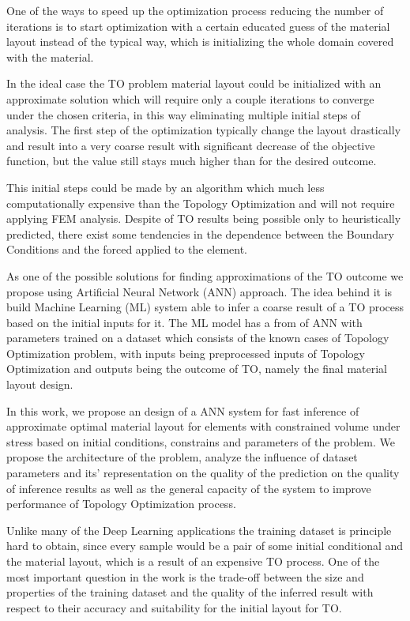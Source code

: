 One of the ways to speed up the optimization process reducing the number of iterations is to start optimization with a certain educated guess of the material layout instead of the typical way, which is initializing the whole domain covered with the material.
\bigskip

In the ideal case the TO problem material layout could be initialized with an approximate solution which will require only a couple iterations to converge under the chosen criteria, in this way eliminating multiple initial steps  of analysis.
The first step of the optimization typically change the layout drastically and result into a very coarse result with significant decrease of the objective function, but the value still stays much higher than for the desired outcome. 
\bigskip

This initial steps could be made by an algorithm which much less computationally expensive than the Topology Optimization and will not require applying FEM analysis. 
Despite of TO results being possible only to heuristically predicted, there exist some tendencies in the dependence between the Boundary Conditions and the forced applied to the element. 
\bigskip

As one of the possible solutions for finding approximations of the TO outcome we propose using Artificial Neural Network (ANN) approach.
The idea behind it is build Machine Learning (ML) system able to infer a coarse result of a TO process based on the initial inputs for it.
The ML model has a from of ANN with parameters trained on a dataset which consists of the known cases of Topology Optimization problem, with inputs being preprocessed inputs of Topology Optimization and outputs being the outcome of TO, namely the final material layout design.

In this work, we propose an design of a ANN system for fast inference of approximate optimal material layout for elements with constrained volume under stress based on initial conditions, constrains and parameters of the problem. 
We propose the architecture of the problem, analyze the influence of dataset parameters and its' representation on the quality of the prediction on the quality of inference results as well as the general capacity of the system to improve performance of Topology Optimization process.  


Unlike many of the Deep Learning applications the training dataset is principle hard to obtain, since every sample would be a pair of some initial conditional and the material layout, which is a result of an expensive TO process. 
One of the most important question in the work is the trade-off between the size and properties of the training dataset and the quality of the inferred result with respect to their accuracy and suitability for the initial layout for TO.

